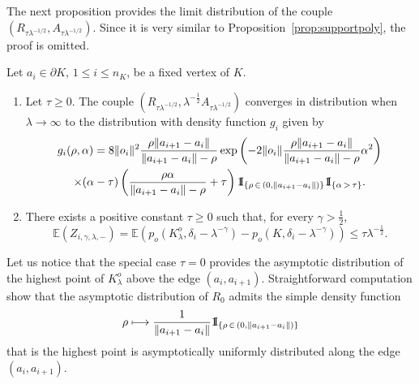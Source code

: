 \documentclass[10pt]{amsart}
\theoremstyle{definition}\newtheorem{defi}[theo]{Definition}\newtheorem{rema}[theo]{Remark}\newtheorem{exam}[theo]{Example}\newtheorem{exem}[theo]{Example}\newtheorem{nota}[theo]{Notation}
\newcommand{\indicat}{{\text{1}}\negthickspace\text{I}}
\newcommand{\E}{\mathbb{E}}
\newcommand{\pass}{\vspace{0.3cm}\noindent}
\newcommand{\noi}{\noindent}
\newcommand*{\romanenumi}{\renewcommand*{\theenumi}{\roman{enumi}}}
\begin{document}
The next proposition provides the limit distribution of the couple $(R_{\tau\lambda^{-1/2}},A_{\tau\lambda^{-1/2}})$. Since it is very similar to Proposition~\ref{prop:supportpoly}, the proof is omitted.

\begin{prop}\label{prop:supportpoly2}
Let $a_i\in\partial K$, $1\leq i \leq n_K$, be a fixed vertex of $K$.
\begin{enumerate}\romanenumi
\item \label{prop4.3.1} Let $\tau\ge 0$. The couple $(R_{\tau\lambda^{-1/2}}, \lambda^{-\frac1{2}}A_{\tau\lambda^{-1/2}})$ converges in distribution when $\lambda\to\infty$ to the distribution with density function $g_i$ given by
\begin{multline*}
g_i(\rho,\alpha) = 8\|o_i\|^2\frac{\rho\|a_{i+1}-a_i\|}{\|a_{i+1}-a_i\|-\rho}\exp\left(-2\|o_i\|\frac{\rho\|a_{i+1}-a_i\|}{\|a_{i+1}-a_i\|-\rho}\alpha^2\right) \\
\times (\alpha-\tau)\left(\frac{\rho\alpha}{\|a_{i+1}-a_i\|-\rho}+\tau\right)\indicat_{\left\{\rho\,\in\,\left(0,\left\|a_{i+1}-a_i\right\|\right)\right\}}\indicat_{\left\{\alpha\,>\,\tau\right\}}.
\end{multline*}
\item \label{prop4.3.2}There exists a positive constant $\tau\ge 0$ such that, for every $\gamma>\tfrac1{2}$,
\[
\E\left(Z_{i,\gamma,\lambda,-}\right) =\E\left(p_o\left(K_{\lambda}^o,\delta_i-\lambda^{-\gamma}\right)-p_o\left(K,\delta_i-\lambda^{-\gamma}\right)\right) \leq \tau\lambda^{-\frac1{2}}.
\]
\end{enumerate}
\end{prop}

Let us notice that the special case $\tau=0$ provides the asymptotic distribution of the highest point of $K_{\lambda}^o$ above the edge $(a_i,a_{i+1})$. Straightforward computation show that the asymptotic distribution of $R_0$ admits the simple density function
\begin{align*}
\rho\longmapsto \frac1{\|a_{i+1}-a_i\|}\indicat_{\left\{\rho\,\in\,\left(0,\left\|a_{i+1}-a_i\right\|\right)\right\}}
\end{align*}
that is the highest point is asymptotically uniformly distributed along the edge $(a_i,a_{i+1})$.
\vspace{0.2em}
\end{document}
